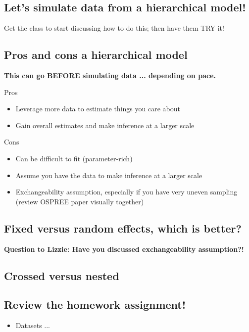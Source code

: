 \documentclass[11pt]{article}
\begin{document}
\subsection{Let's simulate data from a hierarchical model!}

Get the class to start discussing how to do this; then have them TRY it!


\subsection{Pros and cons a hierarchical model}
{\bf This can go BEFORE simulating data ... depending on pace.}

Pros
\begin{itemize}
\item Leverage more data to estimate things you care about
\item Gain overall estimates and make inference at a larger scale
\end{itemize}

Cons
\begin{itemize}
\item Can be difficult to fit (parameter-rich)
\item Assume you have the data to make inference at a larger scale
\item Exchangeability assumption, especially if you have very uneven sampling (review OSPREE paper visually together)
\end{itemize}
 

\subsection{Fixed versus random effects, which is better?}

{\bf Question to Lizzie: Have you discussed exchangeability assumption?!}

\subsection{Crossed versus nested}



\subsection{Review the homework assignment!}
\begin{itemize}
\item Datasets ... 
\end{itemize}
\end{document}
